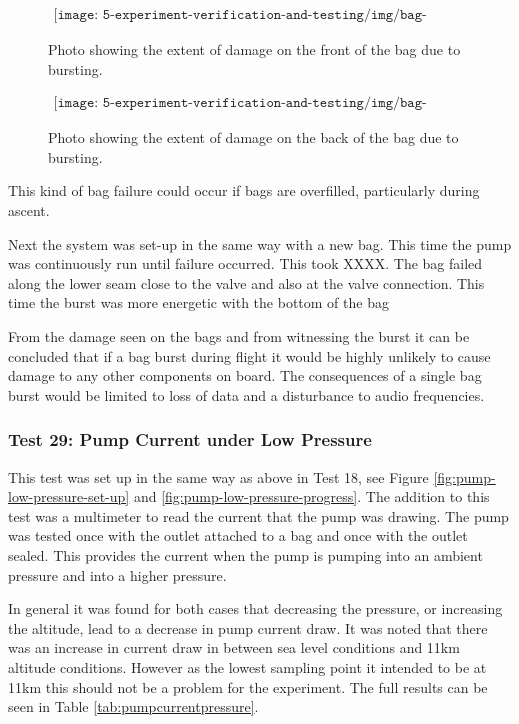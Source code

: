 \begin{figure}[H]
    \begin{align*}
        \texttt{[image: 5-experiment-verification-and-testing/img/bag-burst-front.png]}
    \end{align*}
    \caption {Photo showing the extent of damage on the front of the bag due to bursting.} \label{fig:bag-burst-front}
\end{figure}

\begin{figure}[H]
    \begin{align*}
        \texttt{[image: 5-experiment-verification-and-testing/img/bag-burst-back.png]}
    \end{align*}
    \caption {Photo showing the extent of damage on the back of the bag due to bursting.} \label{fig:bag-burst-back}
\end{figure}

This kind of bag failure could occur if bags are overfilled, particularly during ascent.

Next the system was set-up in the same way with a new bag. This time the pump was continuously run until failure occurred. This took XXXX. The bag failed along the lower seam close to the valve and also at the valve connection. This time the burst was more energetic with the bottom of the bag 

From the damage seen on the bags and from witnessing the burst it can be concluded that if a bag burst during flight it would be highly unlikely to cause damage to any other components on board. The consequences of a single bag burst would be limited to loss of data and a disturbance to audio frequencies. 

\subsubsection{Test 29: Pump Current under Low Pressure}

This test was set up in the same way as above in Test 18, see Figure \ref{fig:pump-low-pressure-set-up} and \ref{fig:pump-low-pressure-progress}. The addition to this test was a multimeter to read the current that the pump was drawing. The pump was tested once with the outlet attached to a bag and once with the outlet sealed. This provides the current when the pump is pumping into an ambient pressure and into a higher pressure.

In general it was found for both cases that decreasing the pressure, or increasing the altitude, lead to a decrease in pump current draw. It was noted that there was an increase in current draw in between sea level conditions and 11km altitude conditions. However as the lowest sampling point it intended to be at 11km this should not be a problem for the experiment. The full results can be seen in Table \ref{tab:pumpcurrentpressure}. 

